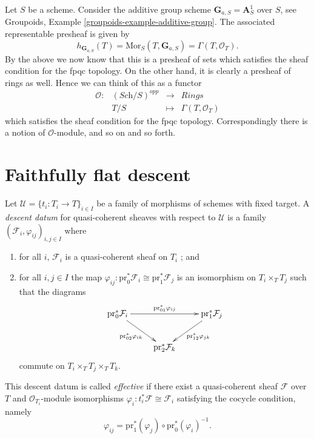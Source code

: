 \begin{example}
\label{example-additive-group-sheaf}
Let $S$ be a scheme.
Consider the additive group scheme $\mathbf{G}_{a,S} = \mathbf{A}^1_S$
over $S$, see
Groupoids, Example \ref{groupoids-example-additive-group}.
The associated representable presheaf is given by
$$
h_{\mathbf{G}_{a,S}}(T) =
\text{Mor}_S(T, \mathbf{G}_{a,S}) =
\Gamma(T,\mathcal{O}_T).
$$
By the above we now know that this is a presheaf of sets which satisfies the
sheaf condition for the fpqc topology. On the other hand, it is clearly
a presheaf of rings as well. Hence we can think of this as a functor
$$
\begin{matrix}
\mathcal{O} : &
(\textit{Sch}/S)^{opp} &
\longrightarrow &
\textit{Rings} \\
&
T/S &
\longmapsto &
\Gamma(T, \mathcal{O}_{T})
\end{matrix}
$$
which satisfies the sheaf condition for the fpqc topology.
Correspondingly there is a notion of $\mathcal{O}$-module, and so on and
so forth.
\end{example}




\section{Faithfully flat descent}
\label{section-fpqc-descent}

\begin{definition}
\label{definition-descent-datum}
Let $\mathcal{U} = \{ t_i : T_i \to T\}_{i \in I}$ be a family of
morphisms of schemes with fixed target. A {\it descent datum} for
quasi-coherent sheaves with respect to
$\mathcal{U}$ is a family $(\mathcal{F}_i, \varphi_{ij})_{i,j\in I}$ where
\begin{enumerate}
\item for all $i$, $\mathcal{F}_i$ is a quasi-coherent sheaf on $T_i$ ; and
\item for all $i, j \in I$ the map
$\varphi_{ij} : \text{pr}_0^* \mathcal{F}_i \cong \text{pr}_1^* \mathcal{F}_j$
is an isomorphism on $T_i \times_T T_j$ such that the diagrams
$$
\xymatrix{
{\text{pr}_0^* \mathcal{F}_i} \ar_{\text{pr}_{02}^*\varphi_{ik}}[dr]
\ar^{\text{pr}_{01}^*\varphi_{ij}}[rr] & & {\text{pr}_1^*
\mathcal{F}_j}\ar^{\text{pr}_{12}^*\varphi_{jk}}[dl] \\
& {\text{pr}_2^* \mathcal{F}_k}
}
$$
commute on $T_i \times_T T_j \times_T T_k$.
\end{enumerate}
This descent datum is called {\it effective} if there exist a quasi-coherent
sheaf $\mathcal{F}$ over $T$ and $\mathcal{O}_{T_i}$-module isomorphisms
$\varphi_i : t_i^* \mathcal{F} \cong \mathcal{F}_i$ satisfying the cocycle
condition, namely
$$
\varphi_{ij} = \text{pr}_1^* (\varphi_j) \circ \text{pr}_0^* (\varphi_i)^{-1}.
$$
\end{definition}

